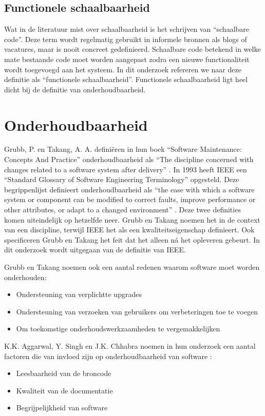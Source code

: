 \subsection{Functionele schaalbaarheid}
Wat in de literatuur mist over schaalbaarheid is het schrijven van \enquote{schaalbare code}. Deze term wordt regelmatig gebruikt in informele bronnen als blogs of vacatures, maar is nooit concreet gedefinieerd. Schaalbare code betekend in welke mate bestaande code moet worden aangepast zodra een nieuwe functionaliteit wordt toegevoegd aan het systeem. In dit onderzoek refereren we naar deze definitie als \enquote{functionele schaalbaarheid}. Functionele schaalbaarheid ligt heel dicht bij de definitie van onderhoudbaarheid.

\section{Onderhoudbaarheid}
Grubb, P. en Takang, A. A. definiëren in hun boek \enquote{Software Maintenance: Concepts And Practice} onderhoudbaarheid als \enquote{The discipline concerned with changes related to a software system after delivery} \parencite{MaintenanceConcepts}. In 1993 heeft IEEE een \enquote{Standard Glossary of Software Engineering Terminology} opgesteld. Deze begrippenlijst definieert onderhoudbaarheid als \enquote{the ease with which a software system or component can be modified to correct faults, improve performance or other attributes, or adapt to a changed environment} \parencite{SENTerminology}. Deze twee definities komen uiteindelijk op hetzelfde neer. Grubb en Takang noemen het in de context van een discipline, terwijl IEEE het als een kwaliteitseigenschap definieert. Ook specificeren Grubb en Takang het feit dat het alleen ná het opleveren gebeurt. In dit onderzoek wordt uitgegaan van de definitie van IEEE.

Grubb en Takang noemen ook een aantal redenen waarom software moet worden onderhouden:
\begin{itemize}
	\item Ondersteuning van verplichtte upgrades
	\item Ondersteuning van verzoeken van gebruikers om verbeteringen toe te voegen
	\item Om toekomstige onderhoudswerkzaamheden te vergemakkelijken
\end{itemize}

K.K. Aggarwal, Y. Singh en J.K. Chhabra noemen in hun onderzoek een aantal factoren die van invloed zijn op onderhoudbaarheid van software \parencite{MaintainabilityMeasure}:
\begin{itemize}
	\item Leesbaarheid van de broncode
	\item Kwaliteit van de documentatie
	\item Begrijpelijkheid van software
\end{itemize}

